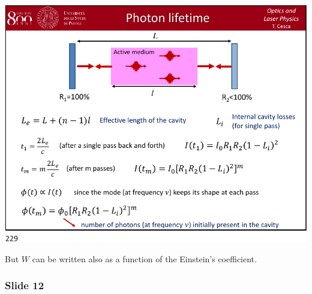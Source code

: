 \documentclass[../main/main.tex]{subfiles}
\begin{document}
\begin{minipage}[]{0.5\linewidth}
\centering
\includegraphics[page=11,width=1\textwidth]{../lessons/pdf_file/12_lecture.pdf}
\end{minipage}
\hspace{0.3cm}\vspace{0.3cm}
\begin{minipage}[c]{0.47\linewidth}

But \( W \) can be written also as a function of the Einstein's coefficient.

\end{minipage}

\subsubsection*{Slide 12}
\end{document}
